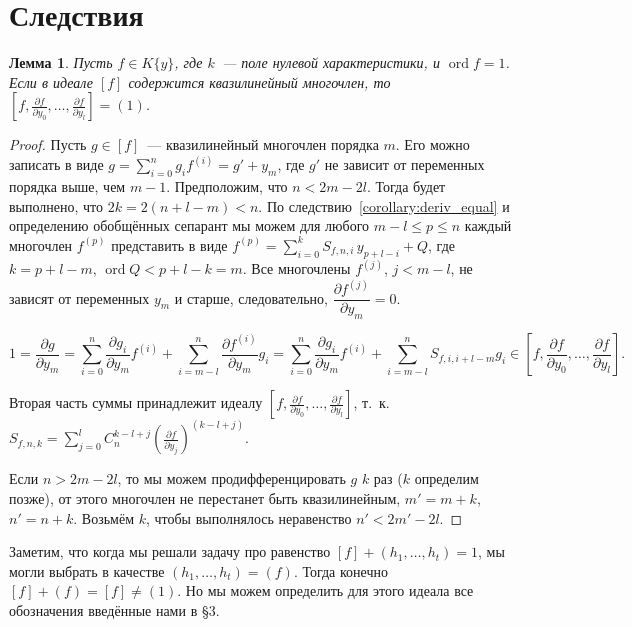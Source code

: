 \documentclass[16pt]{article}
\DeclareMathOperator{\ord}{ord}
\theoremstyle{plain1}
\newtheorem{lemma}[theorem1]{Лемма}
\theoremstyle{plain2}
\theoremstyle{plain}
\theoremstyle{plain3}
\theoremstyle{definition}
\theoremstyle{remark}
\begin{document}
\section{Следствия}

\begin{lemma}
Пусть $f\in K\{y\}$, где $k$~--- поле нулевой характеристики, и $\ord f = 1$.
Если в идеале $[f]$ содержится квазилинейный многочлен, то $\left[f,\frac{\partial f}{\partial y_0},\ldots,\frac{\partial f}{\partial y_l}\right]=(1)$.
\end{lemma}

\begin{proof}
Пусть $g\in [f]$~--- квазилинейный многочлен порядка $m$.
Его можно записать в виде $g=\sum\limits_{i=0}^ng_if^{(i)}=g'+y_m$, где $g'$ не зависит от переменных порядка выше, чем $m-1$.
Предположим, что $n<2m-2l$. Тогда будет выполнено, что $2k=2(n+l-m)<n$.
По следствию~\ref{corollary:deriv_equal} и определению обобщённых сепарант мы можем для любого $m-l\leqslant p\leqslant n$  каждый многочлен $f^{(p)}$ представить в виде $f^{(p)}=\sum\limits_{i=0}^{k} S_{f,n,i} \, y_{p+l -i}+ Q$, где $k=p+l-m$, $\ord Q < p+l-k=m$.
Все многочлены $f^{(j)}$, $j<m-l$, не зависят от переменных $y_m$ и старше, следовательно, $\dfrac{\partial f^{(j)}}{\partial y_m}=0$.

$$
1= \frac{\partial g}{\partial y_m}=\sum\limits_{i=0}^{n}\frac{\partial g_i}{\partial y_m}f^{(i)}+\sum\limits_{i=m-l}^{n}\frac{\partial f^{(i)}}{\partial y_m}g_i= \sum\limits_{i=0}^{n}\frac{\partial g_i}{\partial y_m}f^{(i)}+\sum\limits_{i=m-l}^{n}S_{f,i,i+l-m}g_i\in \left[f,\frac{\partial f}{\partial y_0},\ldots,\frac{\partial f}{\partial y_l}\right].
$$

Вторая часть суммы принадлежит идеалу $\left[f,\frac{\partial f}{\partial y_0},\ldots,\frac{\partial f}{\partial y_l}\right]$,
т.~к. $S_{f,n,k}=\sum\limits_{j=0}^{l}C_n^{k - l + j
}\left(\frac{\partial f}{\partial y_j}\right)^{(k - l + j)}$. %

Если $n>2m-2l$, то мы можем продифференцировать $g$ $k$ раз ($k$ определим позже), от этого многочлен не перестанет быть квазилинейным, $m'=m+k$, $n'=n+k$. Возьмём $k$, чтобы выполнялось неравенство $n'<2m'-2l$.

\end{proof}

Заметим, что когда мы решали задачу про равенство $[f]+(h_1,\ldots,h_t)=1$, мы могли выбрать в качестве $ (h_1,\ldots,h_t)=(f)$. Тогда конечно $[f]+(f)=[f]\ne (1)$. Но мы можем определить для этого идеала все обозначения введённые нами в \S3.
\end{document}
